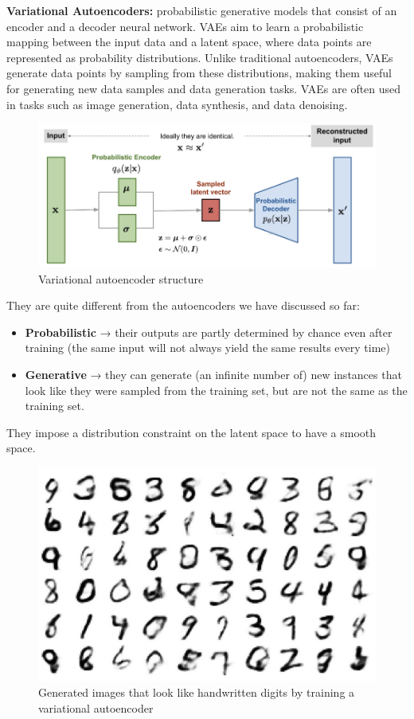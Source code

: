 \begin{definition}
    \textbf{Variational Autoencoders:} probabilistic generative models that consist of an encoder and a decoder neural network. VAEs aim to learn a probabilistic mapping between the input data and a latent space, where data points are represented as probability distributions. Unlike traditional autoencoders, VAEs generate data points by sampling from these distributions, making them useful for generating new data samples and data generation tasks. VAEs are often used in tasks such as image generation, data synthesis, and data denoising.
\end{definition}

\begin{figure}[h!t]
    \centering
    \includegraphics[width=0.5\linewidth]{vae.png}
    \caption{Variational autoencoder structure}
    \label{fig:enter-label}
\end{figure}

They are quite different from the autoencoders we have discussed so far:
\begin{itemize}
    \item \textbf{Probabilistic} → their outputs are partly determined by chance even after training (the same input will not always yield the same results every time)
    \item \textbf{Generative }→ they can generate (an infinite number of) new instances that look like they were sampled from the training set, but are not the same as the training set.
\end{itemize}
They impose a distribution constraint on the latent space to have a smooth space.\\

\begin{figure}[h!t]
    \centering
    \includegraphics[width=0.35\linewidth]{generativeVae.png}
    \caption{Generated images that look like handwritten digits by training a variational autoencoder}
    \label{fig:enter-label}
\end{figure}

